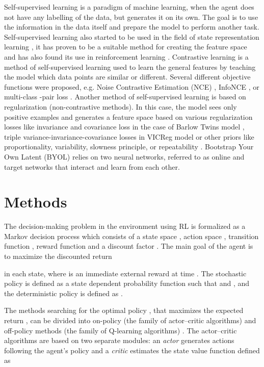 \documentclass[a4paper,11pt]{elsarticle}
\begin{document}
Self-supervised learning is a paradigm of machine learning, when the agent does not have any labelling of the data, but generates it on its own. The goal is to use the information in the data itself and prepare the model to perform another task. Self-supervised learning also started to be used in the field of state representation learning \citep{Timoth2018}, it has proven to be a suitable method for creating the feature space \citep{Anand2019} and has also found its use in reinforcement learning \citep{Srinivas2020, guo2022byol}. Contrastive learning \citep{Chopra2005} is a method of self-supervised learning used to learn the general features by teaching the model which data points are similar or different. Several different objective functions were proposed, e.g. Noise Contrastive Estimation (NCE) \citep{Gutmann2010}, InfoNCE \citep{Oord2018}, or multi-class -pair loss \citep{Sohn2016}. Another method of self-supervised learning is based on regularization (non-contrastive methods). In this case, the model sees only positive examples and generates a feature space based on various regularization losses like invariance and covariance loss in the case of Barlow Twins model \citep{Zbontar2021}, triple variance-invariance-covariance losses in VICReg model \citep{Bardes2022} or other priors like proportionality, variability, slowness principle, or repeatability \citep{jonschkowski2015learning}. 
Bootstrap Your Own Latent (BYOL) \citep{grill2020bootstrap} relies on two neural networks, referred to as online and target networks that interact and learn from each other.

\section{Methods}
\label{sec:methods}

The decision-making problem in the environment using RL is formalized as a Markov decision process which consists of a state space , action space , transition function , reward function  and a discount factor . The main goal of the agent is to maximize the discounted return  

in each state, where  is an immediate external reward at time .
The stochastic policy is defined as a state dependent probability function  such that
 and ,
and the deterministic policy  is defined as .

The methods searching for the optimal policy , that maximizes the expected return , can be divided into on-policy (the family of actor--critic algorithms) \cite{schulman2017proximal}
and off-policy methods (the family of Q-learning algorithms) \cite{mnih2013playing}.
The actor--critic algorithms are based on two separate modules: an \textit{actor} generates actions following the agent's policy  and a \textit{critic} estimates the state value function  defined as
\end{document}
